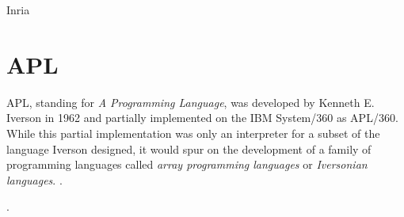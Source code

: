 Inria

\section{APL}

APL, standing for \textit{A Programming Language}, was developed by Kenneth E. Iverson in 1962
and partially implemented on the IBM System/360 as APL/360.
While this partial implementation was only an interpreter for a subset of the language Iverson
designed, it would spur on the development of a family of programming languages
called \textit{array programming languages} or \textit{Iversonian languages}.
.

.
